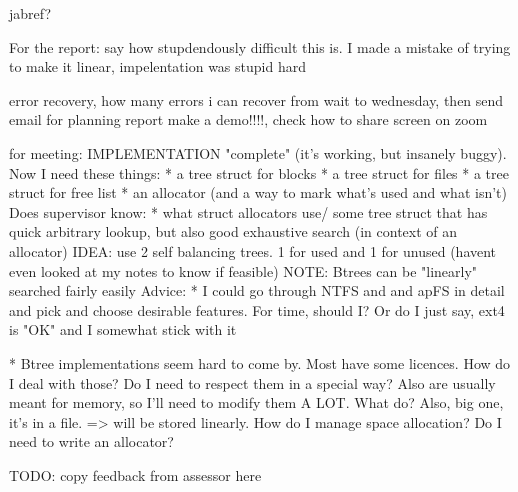 \documentclass[a4paper]{report}
\begin{document}
    jabref?

    For the report: say how stupdendously difficult this is. I made a mistake
    of trying to make it linear, impelentation was stupid hard

    error recovery, how many errors i can recover from
    wait to wednesday, then send email for planning report
    make a demo!!!!, check how to share screen on zoom


    for meeting:
    IMPLEMENTATION "complete" (it's working, but insanely buggy). Now I need these things:
        * a tree struct for blocks
        * a tree struct for files
        * a tree struct for free list
        * an allocator (and a way to mark what's used and what isn't)
    Does supervisor know:
        * what struct allocators use/ some tree struct that has quick arbitrary
        lookup, but also good exhaustive search (in context of an allocator)
        IDEA: use 2 self balancing trees. 1 for used and 1 for unused (havent
        even looked at my notes to know if feasible)
        NOTE: Btrees can be "linearly" searched fairly easily
    Advice:
        * I could go through NTFS and and apFS in detail and pick and choose
            desirable features. For time, should I? Or do I just say, ext4 is "OK"
            and I somewhat stick with it

        * Btree implementations seem hard to come by. Most have some licences.
            How do I deal with those? Do I need to respect them in a special
            way? Also are usually meant for memory, so I'll need to modify them
            A LOT. What do? Also, big one, it's in a file. => will be stored
            linearly. How do I manage space allocation? Do I need to write an
            allocator?

            TODO: copy feedback from assessor here
\end{document}
